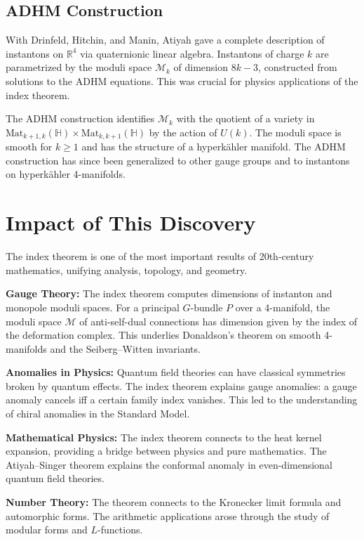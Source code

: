 \subsection*{ADHM Construction}

With Drinfeld, Hitchin, and Manin, Atiyah gave a complete description of
instantons on $\mathbb{R}^4$ via quaternionic linear algebra. Instantons of
charge $k$ are parametrized by the moduli space $\mathcal{M}_k$ of dimension
$8k - 3$, constructed from solutions to the ADHM equations. This was crucial
for physics applications of the index theorem.

The ADHM construction identifies $\mathcal{M}_k$ with the quotient of a
variety in $\text{Mat}_{k+1,k}(\mathbb{H}) \times \text{Mat}_{k,k+1}(\mathbb{H})$
by the action of $U(k)$. The moduli space is smooth for $k \geq 1$ and has
the structure of a hyperkähler manifold. The ADHM construction has
since been generalized to other gauge groups and to instantons on
hyperkähler 4-manifolds.

\section{Impact of This Discovery}

The index theorem is one of the most important results of 20th-century
mathematics, unifying analysis, topology, and geometry.

\textbf{Gauge Theory:} The index theorem computes dimensions of instanton and
monopole moduli spaces. For a principal $G$-bundle $P$ over a 4-manifold, the
moduli space $\mathcal{M}$ of anti-self-dual connections has dimension given by
the index of the deformation complex. This underlies Donaldson's theorem on
smooth 4-manifolds and the Seiberg--Witten invariants.

\textbf{Anomalies in Physics:} Quantum field theories can have classical
symmetries broken by quantum effects. The index theorem explains gauge anomalies:
a gauge anomaly cancels iff a certain family index vanishes. This led to the
understanding of chiral anomalies in the Standard Model.

\textbf{Mathematical Physics:} The index theorem connects to the heat kernel
expansion, providing a bridge between physics and pure mathematics. The
Atiyah--Singer theorem explains the conformal anomaly in even-dimensional
quantum field theories.

\textbf{Number Theory:} The theorem connects to the Kronecker limit formula and
automorphic forms. The arithmetic applications arose through the study of
modular forms and $L$-functions.

